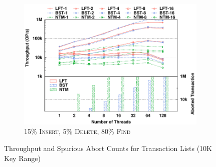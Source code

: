\documentclass{sig-alternate-05-2015}
\begin{document}
\begin{figure}[t]
\begin{subfigure}{0.325\textwidth}
        \includegraphics[width=1\columnwidth]{./data/amd15ins10kfilled.pdf}
        \vspace{-0.17in}
        \caption{15\% \textsc{Insert}, 5\% \textsc{Delete}, 80\% \textsc{Find}}
        \label{fig:txnlist15}
    \end{subfigure}
    \caption{Throughput and Spurious Abort Counts for Transaction Lists (10K Key Range)}
    \label{fig:txnlist}
\end{figure}
\end{document}
